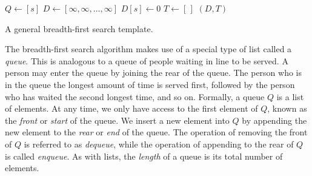 \begin{algorithm}[!htpb]
\dontprintsemicolon  %
\BlankLine
$Q \leftarrow [s]$ \;
$D \leftarrow [\infty, \infty, \dots, \infty]$ \;
$D[s] \leftarrow 0$\;
$T \leftarrow [\,]$\;
\Return $(D, T)$\;
\caption{A general breadth-first search template.}
\label{alg:graph_algorithms:breadth_first_search_template}
\end{algorithm}

The breadth-first search algorithm makes use of a special type of list
called a \emph{queue}. This is analogous to a queue of people waiting
in line to be served. A person may enter the queue by joining the rear
of the queue. The person who is in the queue the longest amount of
time is served first, followed by the person who has waited the second
longest time, and so on. Formally, a queue $Q$ is a list of
elements. At any time, we only have access to the first element of
$Q$, known as the \emph{front} or \emph{start} of the queue. We insert
a new element into $Q$ by appending the new element to the \emph{rear}
or \emph{end} of the queue. The operation of removing the front of $Q$
is referred to as \emph{dequeue}, while the operation of appending to
the rear of $Q$ is called \emph{enqueue}. As with lists, the
\emph{length} of a queue is its total number of elements.


